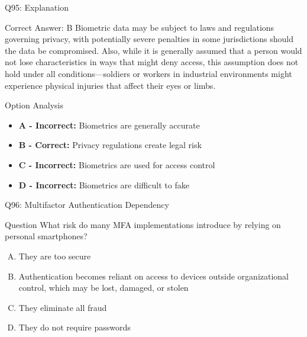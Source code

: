 \documentclass{beamer}
\begin{document}
	\begin{frame}{Q95: Explanation}
		\begin{block}{Correct Answer: B}
			Biometric data may be subject to laws and regulations governing privacy, with potentially severe penalties in some jurisdictions should the data be compromised. Also, while it is generally assumed that a person would not lose characteristics in ways that might deny access, this assumption does not hold under all conditions—soldiers or workers in industrial environments might experience physical injuries that affect their eyes or limbs.
		\end{block}
		\begin{block}{Option Analysis}
			\begin{itemize}
				\item \textbf{A - Incorrect:} Biometrics are generally accurate
				\item \textbf{B - Correct:} Privacy regulations create legal risk
				\item \textbf{C - Incorrect:} Biometrics are used for access control
				\item \textbf{D - Incorrect:} Biometrics are difficult to fake
			\end{itemize}
		\end{block}
	\end{frame}
	
	\begin{frame}{Q96: Multifactor Authentication Dependency}
		\begin{block}{Question}
			What risk do many MFA implementations introduce by relying on personal smartphones?
		\end{block}
		\begin{enumerate}[(A)]
			\item They are too secure
			\item Authentication becomes reliant on access to devices outside organizational control, which may be lost, damaged, or stolen
			\item They eliminate all fraud
			\item They do not require passwords
		\end{enumerate}
	\end{frame}
	
\end{document}
